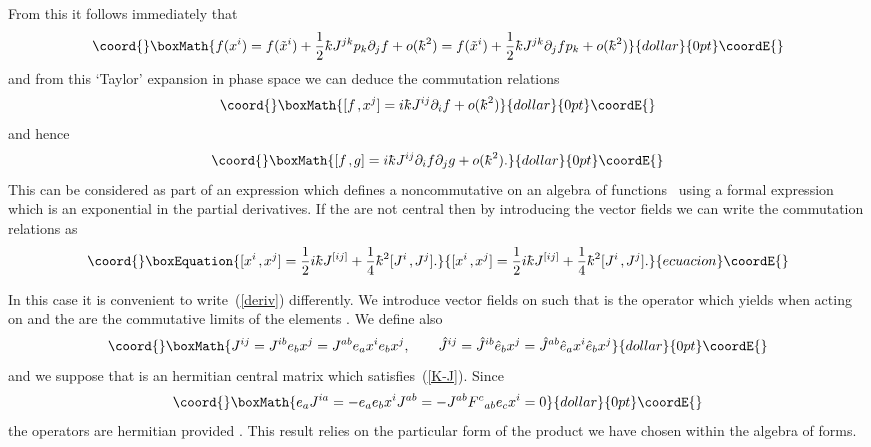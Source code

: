 \documentclass[a4paper,12pt]{article}
\def\h#1{\hat #1}
\def\t#1{\tilde #1}
\def\c#1{{\cal #1}}
\def\kbar{{\mathchar'26\mkern-9muk}}
\def\t#1{\tilde #1}
\def\k{\kern-.1em\mathbin{,}\kern-.1em}
\begin{document}
From this it follows immediately that
$$\coord{}\boxMath{
f(x^i) = f(\t{x}^i) + \frac 12 \kbar J^{jk} p_k \partial_j f +
o(\kbar^2) = f(\t{x}^i) + \frac 12 \kbar J^{jk} \partial_j f p_k +
o(\kbar^2)
}{dollar}{0pt}\coordE{}$$
and from this `Taylor' expansion in phase space we can deduce the
commutation relations
$$\coord{}\boxMath{
[f \k x^j] = i \kbar J^{ij} \partial_i f + o(\kbar^2)
}{dollar}{0pt}\coordE{}$$
and hence
$$\coord{}\boxMath{
[f \k g] = i \kbar J^{ij} \partial_i f \partial_j g + o(\kbar^2).
}{dollar}{0pt}\coordE{}$$
This can be considered as part of an expression which defines a
noncommutative  on an algebra of
functions~\cite{Wey50,Moy49} using a formal expression which is an
exponential in the partial derivatives.  If the \coordHE{} are not
central then by introducing the vector fields \coordHE{} we can write the commutation relations as
\begin{equation}\coord{}\boxEquation{
[x^i \k  x^j] = \frac 12 i \kbar J^{[ij]} + 
\frac 14 \kbar^2 [J^i \k J^j].                                 \label{rep}
}{
[x^i \k  x^j] = \frac 12 i \kbar J^{[ij]} + 
\frac 14 \kbar^2 [J^i \k J^j].                                 }{ecuacion}\coordE{}\end{equation}

In this case it is convenient to write~(\ref{deriv}) differently.  We
introduce \coordHE{} vector fields \coordHE{} on \myHighlight{$\t{\c{A}}$}\coordHE{} such that \coordHE{} is
the operator which yields \myHighlight{$p_a \t{f} = i e_a \t{f}$}\coordHE{} when acting on
\myHighlight{$\t{f}$}\coordHE{} and the \myHighlight{$e_a \t{f} = e^i_a(\t{x}^k) \t{\partial}_i \t{f}$}\coordHE{} are
the commutative limits of the elements \myHighlight{$e_a f \in \c{A}$}\coordHE{}. We define
also
$$\coord{}\boxMath{
J^{ij} = J^{ib} e_b x^j = J^{ab} e_a x^i e_b x^j, \qquad
\h{J}^{ij} = \h{J}^{ib} \h{e}_b x^j = 
\h{J}^{ab} \h{e}_a x^i \h{e}_b x^j
}{dollar}{0pt}\coordE{}$$
and we suppose that \coordHE{} is an hermitian central matrix which
satisfies~(\ref{K-J}). Since
$$\coord{}\boxMath{
e_a J^{ia} = - e_a e_b x^i J^{ab} = - J^{ab} F^c{}_{ab} e_c x^i = 0
}{dollar}{0pt}\coordE{}$$
the operators \coordHE{} are hermitian provided \coordHE{}.  This
result relies on the particular form of the product we have chosen
within the algebra of forms.  
\end{document}
